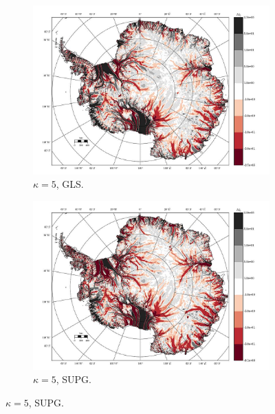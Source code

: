 \begin{figure}
  \begin{subfigure}[b]{0.45\linewidth}
    \includegraphics[width=\linewidth]{images/balance_velocity/antarctica/d_U_ob/misfit_10H_kappa_5_GLS.jpg}
  \caption{$\kappa = 5$, GLS.}
  \label{antarctica_bv_image_kappa_5_GLS_U_ob_misfit}
  \end{subfigure}
  \begin{subfigure}[b]{0.45\linewidth}
    \includegraphics[width=\linewidth]{images/balance_velocity/antarctica/d_U_ob/misfit_10H_kappa_5_SUPG.jpg}
  \caption{$\kappa = 5$, SUPG.}
  \label{antarctica_bv_image_kappa_5_SUPG_U_ob_misfit}
  \end{subfigure}


\end{figure}
